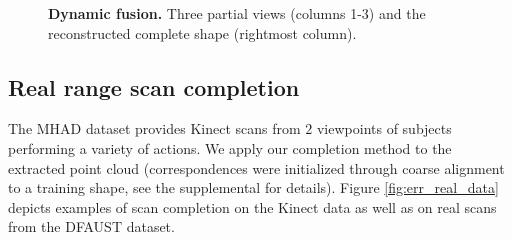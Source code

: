 \begin{figure}
\centering
{}
\vspace{3mm}
\caption{\textbf{Dynamic fusion.} Three partial views (columns 1-3) and the reconstructed complete shape (rightmost column).} 
\label{fig:dynamic_fusion}
\end{figure} 

\subsection{Real range scan completion}
The MHAD dataset \cite{ofli2013berkeley} provides Kinect scans from $2$ viewpoints of subjects performing a variety of actions. We apply our completion method to the extracted point cloud (correspondences were initialized through coarse alignment to a training shape, see the supplemental for details). Figure \ref{fig:err_real_data} depicts examples of scan completion on the Kinect data as well as on real scans from the DFAUST dataset.

